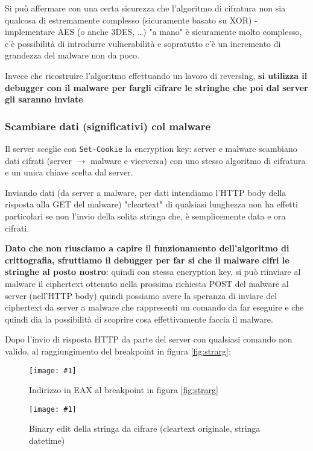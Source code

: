 \documentclass[
    a4paper, %
    11pt %
]{article}
\newcommand{\pic}[4]{\begin{figure}[H]
            \centering
            \texttt{[image: \#1]}
            \caption{#2}
            \label{fig:#1}
            \end{figure}}
\begin{document}
            Si può affermare con una certa sicurezza
            che l'algoritmo di cifratura non sia qualcosa di estremamente complesso (sicuramente basato su XOR) - implementare AES (o anche
            3DES, \dots) "a mano" è sicuramente molto complesso, c'è possibilità di introdurre vulnerabilità e 
            sopratutto c'è un incremento di grandezza del malware non da poco. 

            Invece che ricostruire l'algoritmo effettuando un lavoro di reversing, \textbf{si utilizza il 
            debugger con il malware per fargli cifrare le stringhe che poi dal server gli saranno inviate}

            \subsubsection{Scambiare dati (significativi) col malware}\label{sect:msgxchg}
            
            Il server sceglie con \texttt{Set-Cookie} la encryption key: server e malware scambiano dati cifrati 
            (server $\rightarrow$ malware e viceversa) 
            con uno stesso algoritmo di cifratura e un unica chiave scelta dal server.

            Inviando dati (da server a malware, per dati intendiamo l'HTTP body della risposta alla GET del 
            malware) "cleartext" di qualsiasi lunghezza non ha effetti particolari se non l'invio della solita
            stringa che, è semplicemente data e ora cifrati.

            \textbf{Dato che non riusciamo a capire il funzionamento dell'algoritmo di crittografia, sfruttiamo il debugger
            per far si che il malware cifri le stringhe al posto nostro}: quindi con stessa encryption key, si
            può riinviare al malware il ciphertext ottenuto nella prossima richiesta POST del malware al server (nell'HTTP body) quindi possiamo avere la speranza di inviare del ciphertext da server a malware che rappresenti un comando da far eseguire e che quindi dia la possibilità di scoprire cosa
            effettivamente faccia il malware.
            
            Dopo l'invio di risposta HTTP da parte del server con qualsiasi comando non valido, al raggiungimento
            del breakpoint in figura \ref{fig:strarg}:

            \pic{followdump}{Indirizzo in EAX al breakpoint in figura \ref{fig:strarg}}{8cm}{5cm}

            \pic{edit}{Binary edit della stringa da cifrare (cleartext originale, stringa datetime)}{12cm}{5cm}
\end{document}
